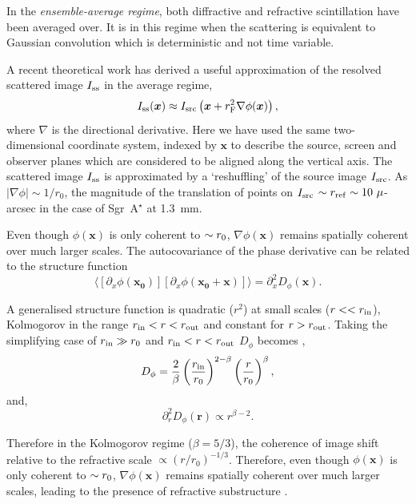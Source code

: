 In the \emph{ensemble-average regime}, both diffractive and refractive scintillation have been averaged over. It is in this regime when the scattering is equivalent to Gaussian convolution which is deterministic and not time variable. 


A recent theoretical work \citep*{Johnson_2015a} has derived a useful approximation of the resolved scattered image $I_{\rm ss}$ in the average regime,
\begin{equation}\label{eq:scatterbrane}
I_{\rm ss}(\boldsymbol{x}) \approx I_{\rm src}\left(\boldsymbol{x} + r_{\rm F}^2 \nabla \phi(\boldsymbol{x})\right),
\end{equation}
where $\nabla$ is the directional derivative. Here we have used the same two-dimensional coordinate system, indexed by $\bm{x}$ to describe the source, screen and observer planes which are considered to be aligned along the vertical axis. The scattered image $I_{\rm ss}$ is approximated by a `reshuffling' of the source image $I_{\rm src}$. As $|\nabla\phi| \sim 1/r_0$, the magnitude of the translation of points on $I_{\rm src}$ $\sim r_{\rm ref} \sim 10\ \mu$-arcsec in the case of Sgr~A$^\star$ at 1.3~mm. 

Even though $\phi(\bm{x})$ is only coherent to $\sim r_{\rm 0}$, $\nabla \phi(\bm{x})$ remains spatially coherent over much larger scales. The autocovariance of the phase derivative can be related to the structure function \citep*{Johnson_2015a}
\begin{equation} 
\langle [ \partial_x \phi(\bm{x_0})] [ \partial_x \phi(\bm{x_0}+\bm{x})] \rangle = \partial_x^2 D_\phi(\bm{x}).
\end{equation}


A generalised structure function \citep{Tatarskii_1971, Narayan_1989} is quadratic ($r^2$) at small scales ($r<< r_{\rm in}$), Kolmogorov in the range $r_{\rm in}<r<r_{\rm out}$ and constant for $r>r_{\rm out}$. Taking the simplifying case of $r_{\rm in} \gg r_0$ and $r_{\rm in}<r<r_{\rm out}$ $D_\phi$ becomes \citep{johnson_dissertation},
\begin{equation}
D_\phi = \frac{2}{\beta}\left( \frac{r_{\rm in}}{r_0}\right)^{2-\beta} \left( \frac{r}{r_0}\right)^\beta, 
\end{equation}
and, 
\begin{equation}
 \partial_r^2 D_\phi(\bm{r}) \propto r^{\beta-2}.
\end{equation}

Therefore in the Kolmogorov regime ($\beta = 5/3$), the coherence of image shift relative to the refractive scale $\propto (r/r_0)^{-1/3}$. Therefore, even though $\phi(\bm{x})$ is only coherent to $\sim r_{\rm 0}$, $\nabla \phi(\bm{x})$ remains spatially coherent over much larger scales, leading to the presence of refractive substructure \citep*{Johnson_2015a}.

